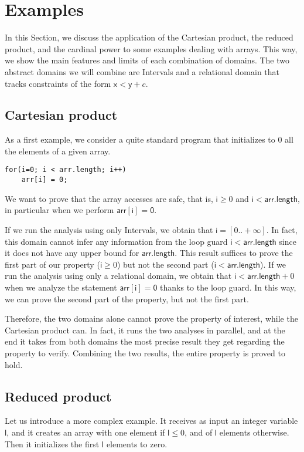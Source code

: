 \documentclass[submission,copyright,creativecommons]{eptcs}
\newcommand{\statement}[1]{\ensuremath{\mathsf{#1}}}
\begin{document}
\section{Examples}
\label{sect:motivatingexamples}
In this Section, we discuss the application of the Cartesian product, the reduced product, and the cardinal power to some examples dealing with arrays. This way, we show the main features and limits of each combination of domains. The two abstract domains we will combine are Intervals \cite{CC77} and a relational domain that tracks constraints of the form $\statement{x} < \statement{y} + c$.

\subsection{Cartesian product}
As a first example, we consider a quite standard program that initializes to 0 all the elements of a given array. 
	\lstset{numbers=none}
\begin{lstlisting}
for(i=0; i < arr.length; i++)
	arr[i] = 0;
\end{lstlisting}

We want to prove that the array accesses are safe, that is, $\statement{i} \geq 0$ and $\statement{i} < \statement{arr.length}$, in particular when we perform \statement{arr[i]=0}. 

If we run the analysis using only Intervals, we obtain that $\statement{i}=[0..+\infty]$. In fact, this domain cannot infer any information from the loop guard \statement{i<arr.length} since it does not have any upper bound for \statement{arr.length}. This result suffices to prove the first part of our property ($\statement{i} \geq 0$) but not the second part ($\statement{i} < \statement{arr.length}$).
If we run the analysis using only a relational domain, we obtain that $\statement{i} < \statement{arr.length}+0$ when we analyze the statement \statement{arr[i]=0} thanks to the loop guard. In this way, we can prove the second part of the property, but not the first part.

Therefore, the two domains alone cannot prove the property of interest, while the Cartesian product can. In fact, it runs the two analyses in parallel, and at the end it takes from both domains the most precise result they get regarding the property to verify. Combining the two results, the entire property is proved to hold.

\subsection{Reduced product}
Let us introduce a more complex example. It receives as input an integer variable \statement{l}, and it creates an array with one element if $\statement{l} \leq 0$, and of \statement{l} elements otherwise. Then it initializes the first \statement{l} elements to zero.
\end{document}
